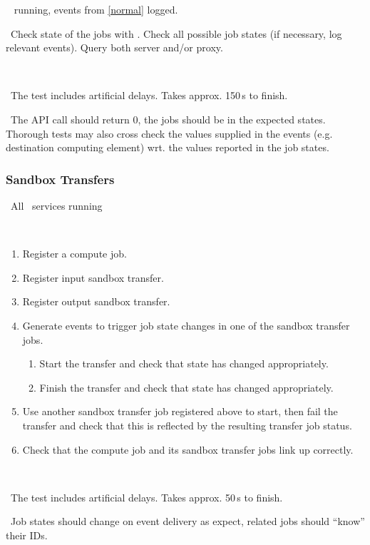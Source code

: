 \req\  running, events from \ref{normal} logged.

\what\ Check state of the jobs with . Check all possible job states 
(if necessary, log relevant events). Query both server and/or proxy.

\how\ 

\note\ The test includes artificial delays. Takes approx. 150\,s to finish.

\result\ The API call should return 0, the jobs should be in the expected
states. Thorough tests may also cross check the values supplied in the
events (e.g. destination computing element) wrt. the values reported in the job states.


\subsubsection{Sandbox Transfers}

\req\ All \LB\ services running

\what\
\begin{enumerate}
\item Register a compute job.
\item Register input sandbox transfer.
\item Register output sandbox transfer.
\item Generate events to trigger job state changes in one of the sandbox transfer jobs.
	\begin{enumerate}
        \item Start the transfer and check that state has changed appropriately.
        \item Finish the transfer and check that state has changed appropriately. 
	\end{enumerate}
\item Use another sandbox transfer job registered above to start, then fail the transfer and check that this is reflected by the resulting transfer job status. 
\item Check that the compute job and its sandbox transfer jobs link up correctly. 

\end{enumerate}

\how\ 

\note\ The test includes artificial delays. Takes approx. 50\,s to finish.

\result\ Job states should change on event delivery as expect, related jobs should ``know'' their IDs.


